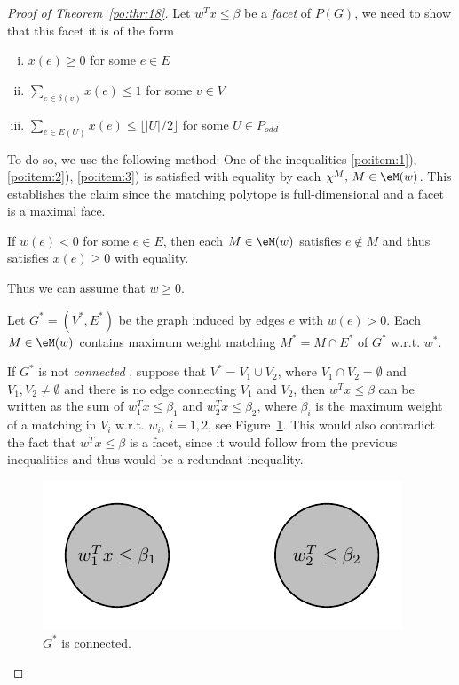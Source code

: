 \begin{proof}[Proof of Theorem~\ref{po:thr:18}]

Let $w^Tx\leq\beta$ be a \emph{facet} of $P(G)$, we need to show that this
facet it is of the form
  \begin{enumerate}[i)]
  \item $x(e)\geq0$ for some $e \in E$\label{po:item:1}
  \item $\sum_{e \in \delta(v)} x(e)\leq1$  for some $v \in V$\label{po:item:2}
  \item $\sum_{e \in E(U)} x(e)\leq \lfloor|U|/2\rfloor$ for some $U \in P_{odd}$\label{po:item:3}
  \end{enumerate}
  
  
  To do so, we use the following method: One of the inequalities
  \ref{po:item:1}), \ref{po:item:2}), \ref{po:item:3}) is satisfied with
  equality by each $\chi^M, \,M \in \eM(w)$. This establishes the claim
  since the matching polytope is full-dimensional and a facet is a
  maximal face. 

  




  If $w(e)<0$ for some $e \in E$, then each $M \in \eM(w)$
  satisfies $e \notin M$ and thus satisfies $x(e)\geq0$ with equality. 

  Thus we can assume that  $w\geq0$. 
  
  Let $G^*=(V^*,E^*)$ be the graph induced by edges $e$ with $w(e)>0$.  Each $M
  \in \eM(w)$ contains maximum weight matching $M^* = M \cap E^*$ of
  $G^*$ w.r.t.  $w^*$. 

  If $G^*$ is not \emph{connected }, suppose that
  $V^*=V_1\cup V_2$, where $V_1\cap V_2 = \emptyset$ and $V_1,V_2 \neq\emptyset$ and there
  is no edge connecting $V_1$ and $V_2$, then
  $w^Tx\leq\beta$ can be written as the sum of $w_1^Tx\leq\beta_1$ and
  $w_2^Tx\leq\beta_2$, where $\beta_i$ is the maximum weight of a matching in
  $V_i$ w.r.t. $w_i$, $i=1,2$, see Figure~\ref{blobs}. This would also contradict the fact
  that $w^Tx\leq\beta$ is a facet, since it would follow from the previous
  inequalities and thus would  be a redundant
  inequality.
    
  \begin{figure}
    \centering
  
        
    \includegraphics{figures/PicPolyhedra7.pdf}
    \caption{$G^*$ is connected. }\label{blobs}
  \end{figure}
   

\end{proof}
